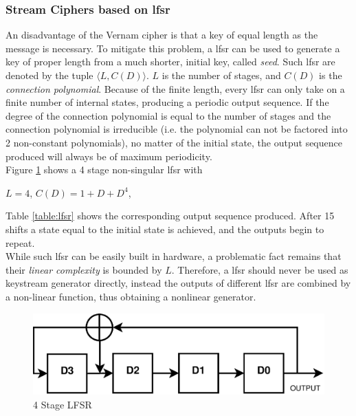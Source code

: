 \subsubsection{Stream Ciphers based on \gls{lfsr}}

An disadvantage of the Vernam cipher is that a key of equal length as the message is necessary. To mitigate this problem, a \gls{lfsr} can be used to generate
a key of proper length from a much shorter, initial key, called \textit{seed}. Such \gls{lfsr} are denoted by the tuple $\langle L, C(D) \rangle$. $L$ is the number of stages, and $C(D)$ is the
\textit{connection polynomial}. Because of the finite length, every \gls{lfsr} can only take on a finite number of internal states, producing
a periodic output sequence.
If the degree of the connection polynomial is equal to the number of stages and the connection polynomial is irreducible (i.e. the polynomial can not
be factored into 2 non-constant polynomials), no matter of the initial state, the output sequence produced will always be of maximum periodicity.
\\
Figure \ref{fig:lsfr} shows a 4 stage non-singular \gls{lfsr} with
\begin{center}
 $L=4$,  $C(D) = 1 + D + D^4$,
\end{center}
Table \ref{table:lfsr} \cite{handbookLFSR} shows the corresponding output sequence produced. After
15 shifts a state equal to the initial state is achieved, and the outputs
begin to repeat.
\\
While such \gls{lfsr} can be easily built in hardware, a problematic fact remains that their \textit{linear complexity} is bounded by $L$. Therefore, a \gls{lfsr}
should never be used as keystream generator directly, instead the outputs of different \gls{lfsr} are combined by a non-linear function, thus obtaining a
nonlinear generator.
\begin{figure}
    \centering
    \includegraphics[width=1\textwidth]{figures/LSFR}
    \caption{4 Stage LFSR}
    \label{fig:lsfr}
\end{figure}

